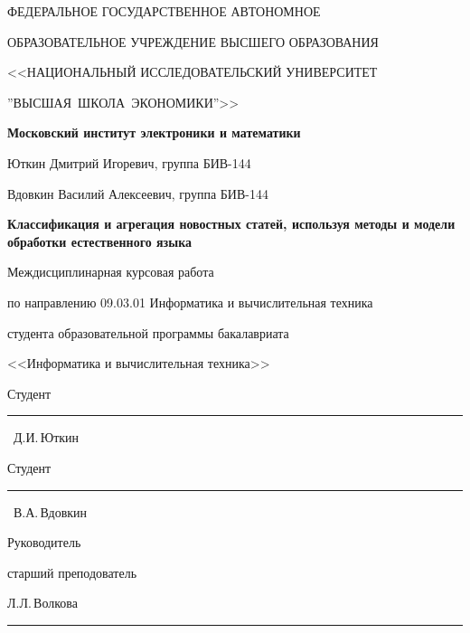 \begin{titlepage}
    \begin{center}
        ФЕДЕРАЛЬНОЕ ГОСУДАРСТВЕННОЕ АВТОНОМНОЕ
        
        ОБРАЗОВАТЕЛЬНОЕ УЧРЕЖДЕНИЕ ВЫСШЕГО ОБРАЗОВАНИЯ
        
       <<НАЦИОНАЛЬНЫЙ ИССЛЕДОВАТЕЛЬСКИЙ УНИВЕРСИТЕТ
       
       ''ВЫСШАЯ~ШКОЛА~ЭКОНОМИКИ''>>
       \vspace{1cm}
 
        \textbf{Московский институт электроники и математики}
        \vspace{1cm}

        Юткин Дмитрий Игоревич, группа БИВ-144
		
		Вдовкин Василий Алексеевич, группа БИВ-144
        \vspace{1cm}
        
        \textbf{Классификация и агрегация новостных статей, используя методы и модели обработки естественного языка}
        
        
        \vspace{1cm}

        Междисциплинарная курсовая работа
        
        по направлению 09.03.01 Информатика и вычислительная техника 

        студента образовательной программы бакалавриата
        
        <<Информатика и вычислительная техника>>
        
    \end{center}
    \vspace{1cm}
    \begin{flushright}
        Студент~\rule{4cm}{.1pt}~Д.И.\,Юткин
        
        Студент~\rule{4cm}{.1pt}~В.А.\,Вдовкин
        
        \vspace{1cm}
        
        Руководитель

        старший преподователь

        Л.Л.\,Волкова
        
        \rule{4cm}{.1pt}
    \end{flushright}
    \vfill{}
\end{titlepage}